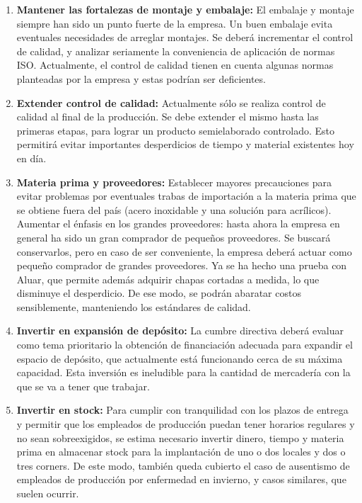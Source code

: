 \documentclass[a4paper,10pt,titlepage]{article}
\begin{document}
\begin{enumerate}
\item \textbf{Mantener las fortalezas de montaje y embalaje:} El embalaje y montaje siempre han sido un punto fuerte de la empresa. Un buen embalaje evita eventuales necesidades de arreglar montajes. Se deber\'a incrementar el control de calidad, y analizar seriamente la conveniencia de aplicaci\'on de normas ISO. Actualmente, el control de calidad tienen en cuenta algunas normas planteadas por la empresa y estas podrían ser deficientes.

\item \textbf{Extender control de calidad:} Actualmente s\'olo se realiza control de calidad al final de la producci\'on. Se debe extender el mismo hasta las primeras etapas, para lograr un producto semielaborado controlado. Esto permitir\'a evitar importantes desperdicios de tiempo y material existentes hoy en d\'ia.

\item \textbf{Materia prima y proveedores:} Establecer mayores precauciones para evitar problemas por eventuales trabas de importaci\'on a la materia prima que se obtiene fuera del pa\'is (acero inoxidable y una soluci\'on para acr\'ilicos). Aumentar el \'enfasis en los grandes proveedores: hasta ahora la empresa en general ha sido un gran comprador de peque\~nos proveedores. Se buscar\'a conservarlos, pero en caso de ser conveniente, la empresa deber\'a actuar como peque\~no comprador de grandes proveedores. Ya se ha hecho una prueba con Aluar, que permite además adquirir chapas cortadas a medida, lo que disminuye el desperdicio. De ese modo, se podr\'an abaratar costos sensiblemente, manteniendo los est\'andares de calidad.

\item \textbf{Invertir en expansi\'on de dep\'osito:} La cumbre directiva deber\'a evaluar como tema prioritario la obtenci\'on de financiaci\'on adecuada para expandir el espacio de dep\'osito, que actualmente está funcionando cerca de su m\'axima capacidad. Esta inversi\'on es ineludible para la cantidad de mercadería con la que se va a tener que trabajar.

\item \textbf{Invertir en stock:} Para cumplir con tranquilidad con los plazos de entrega y permitir que los empleados de producci\'on puedan tener horarios regulares y no sean sobreexigidos, se estima necesario invertir dinero, tiempo y materia prima en almacenar stock para la implantaci\'on de uno o dos locales y dos o tres corners. De este modo, tambi\'en queda cubierto el caso de ausentismo de empleados de producci\'on por enfermedad en invierno, y casos similares, que suelen ocurrir.


\end{enumerate}
\end{document}
